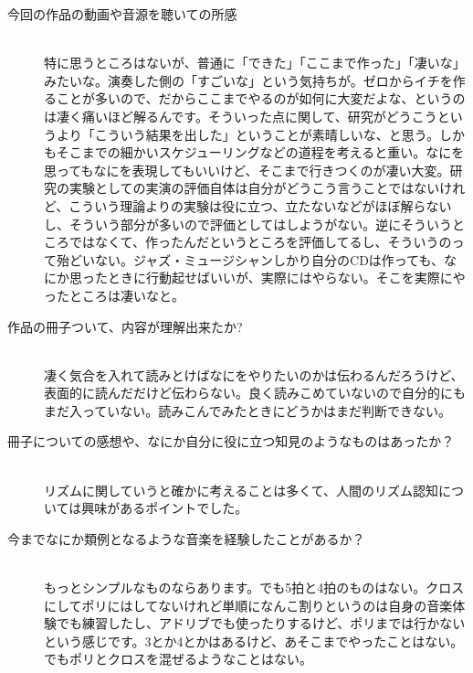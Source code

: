 \documentclass[uplatex,dvipdfmx]{ujarticle}
\begin{document}
\begin{description}
\item[今回の作品の動画や音源を聴いての所感]\mbox{}\\

特に思うところはないが、普通に「できた」「ここまで作った」「凄いな」みたいな。演奏した側の「すごいな」という気持ちが。ゼロからイチを作ることが多いので、だからここまでやるのが如何に大変だよな、というのは凄く痛いほど解るんです。そういった点に関して、研究がどうこうというより「こういう結果を出した」ということが素晴しいな、と思う。しかもそこまでの細かいスケジューリングなどの道程を考えると重い。なにを思ってもなにを表現してもいいけど、そこまで行きつくのが凄い大変。研究の実験としての実演の評価自体は自分がどうこう言うことではないけれど、こういう理論よりの実験は役に立つ、立たないなどがほぼ解らないし、そういう部分が多いので評価としてはしようがない。逆にそういうところではなくて、作ったんだというところを評価してるし、そういうのって殆どいない。ジャズ・ミュージシャンしかり自分のCDは作っても、なにか思ったときに行動起せばいいが、実際にはやらない。そこを実際にやったところは凄いなと。\\

\item [作品の冊子ついて、内容が理解出来たか?]\mbox{}\\

凄く気合を入れて読みとけばなにをやりたいのかは伝わるんだろうけど、表面的に読んだだけど伝わらない。良く読みこめていないので自分的にもまだ入っていない。読みこんでみたときにどうかはまだ判断できない。\\

\item [冊子についての感想や、なにか自分に役に立つ知見のようなものはあったか？]\mbox{}\\

リズムに関していうと確かに考えることは多くて、人間のリズム認知については興味があるポイントでした。\\

\item [今までなにか類例となるような音楽を経験したことがあるか？]\mbox{}\\

もっとシンプルなものならあります。でも5拍と4拍のものはない。クロスにしてポリにはしてないけれど単順になんこ割りというのは自身の音楽体験でも練習したし、アドリブでも使ったりするけど、ポリまでは行かないという感じです。3とか4とかはあるけど、あそこまでやったことはない。でもポリとクロスを混ぜるようなことはない。\\


\end{description}
\end{document}
